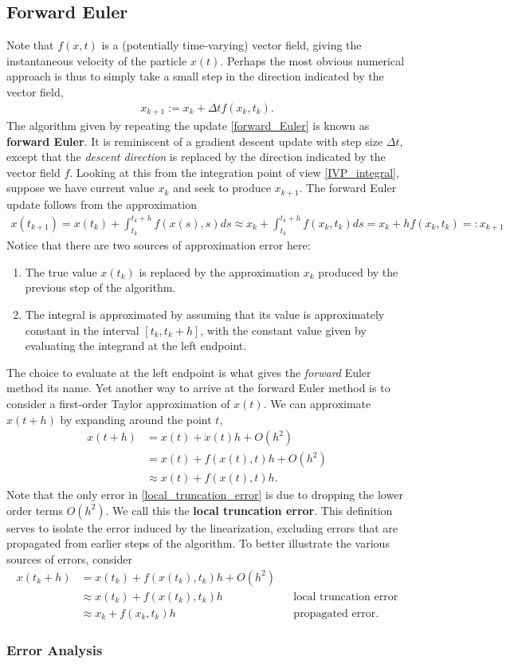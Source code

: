 \documentclass[12pt]{article}
\begin{document}
\subsection{Forward Euler}
Note that $f(x,t)$ is a (potentially time-varying) vector field, giving the instantaneous velocity of the particle $x(t)$. Perhaps the most obvious numerical 
approach is thus to simply take a small step in the direction indicated by the vector field,
\begin{align}
x_{k+1} := x_k + \Delta t f(x_k, t_k). \label{forward_Euler}
\end{align}
The algorithm given by repeating the update \ref{forward_Euler} is known as \textbf{forward Euler}. It is reminiscent of a gradient descent update with 
step size $\Delta t$, except that the \textit{descent direction} is replaced by the direction indicated by the vector field $f$. Looking at this from the 
integration point of view \ref{IVP_integral}, suppose we have current value $x_k$ and seek to produce $x_{k+1}$. The forward Euler update follows from 
the approximation 
\begin{align*}
x(t_{k+1}) = x(t_k) + \int_{t_k}^{t_k + h} f(x(s),s) ds \approx x_k + \int_{t_k}^{t_k + h} f(x_k,t_k) ds = x_k + h f(x_k, t_k) =: x_{k+1}
\end{align*}
Notice that there are two sources of approximation error here: 
\begin{enumerate}
\item The true value $x(t_k)$ is replaced by the approximation $x_k$ produced by the previous step of the algorithm. 
\item The integral is approximated by assuming that its value is approximately constant in the interval $[t_k, t_k + h]$, with the constant value given by 
evaluating the integrand at the left endpoint.
\end{enumerate}
The choice to evaluate at the left endpoint is what gives the \textit{forward} Euler method its name. Yet another way to arrive at the forward Euler method 
is to consider a first-order Taylor approximation of $x(t)$. We can approximate $x(t+h)$ by expanding around the point $t$, 
\begin{align}
x(t+h) 
&= x(t) + \dot{x}(t)h + O(h^2) \nonumber \\
&= x(t) + f(x(t), t)h + O(h^2) \nonumber \\
&\approx x(t) + f(x(t),t)h. \label{local_truncation_error}
\end{align}
Note that the only error in \ref{local_truncation_error} is due to dropping the lower order terms $O(h^2)$. We call this the \textbf{local truncation error}. This 
definition serves to isolate the error induced by the linearization, excluding errors that are propagated from earlier steps of the algorithm. To better illustrate
the various sources of errors, consider 
\begin{align*}
x(t_k + h) 
&= x(t_k) + f(x(t_k), t_k)h + O(h^2) \\
&\approx x(t_k) + f(x(t_k), t_k)h && \text{local truncation error} \\
&\approx x_k + f(x_k, t_k)h && \text{propagated error}.
\end{align*}

\subsubsection{Error Analysis}
\end{document}
